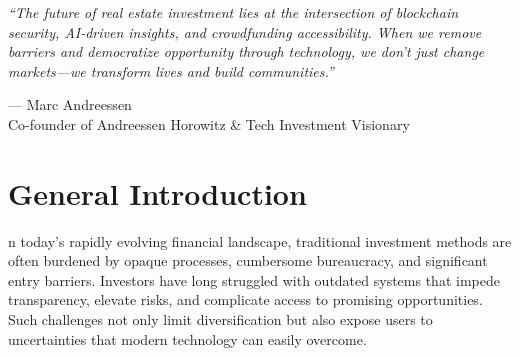 \thispagestyle{empty}

\vspace*{\fill}

\begin{center}
\begin{minipage}{1\textwidth}
    \begin{center}
        \large\itshape ``The future of real estate investment lies at the intersection of blockchain security, AI-driven insights, and crowdfunding accessibility. When we remove barriers and democratize opportunity through technology, we don't just change markets—we transform lives and build communities.''
        \vspace{1cm}
        
        \normalfont\textcolor{primary}{— Marc Andreessen}\\
        \small\textcolor{secondary}{Co-founder of Andreessen Horowitz \& Tech Investment Visionary}
    \end{center}
\end{minipage}
\end{center}

\vspace*{\fill}

\newpage
\thispagestyle{empty}

\chapter*{\centering General Introduction}
\vspace{-1cm} %



\begingroup %
\setlength{\parindent}{0pt} %
\setlength{\parskip}{0.15em} %
\footnotesize %

n today's rapidly evolving financial landscape, traditional investment methods are often burdened by opaque processes, cumbersome bureaucracy, and significant entry barriers. Investors have long struggled with outdated systems that impede transparency, elevate risks, and complicate access to promising opportunities. Such challenges not only limit diversification but also expose users to uncertainties that modern technology can easily overcome.

